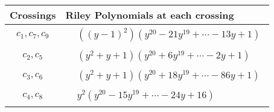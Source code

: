 \documentclass[1p]{elsarticle_modified}
\theoremstyle{definition}
\begin{document}
\begin{tabular}{m{50pt}|m{274pt}}
Crossings & \hspace{64pt}Riley Polynomials at each crossing \\
\hline $$\begin{aligned}c_{1},c_{7},c_{9}\end{aligned}$$&$\begin{aligned}
&((y-1)^2)(y^{20}-21 y^{19}+\cdots-13 y+1)
\end{aligned}$\\
\hline $$\begin{aligned}c_{2},c_{5}\end{aligned}$$&$\begin{aligned}
&(y^2+y+1)(y^{20}+6 y^{19}+\cdots-2 y+1)
\end{aligned}$\\
\hline $$\begin{aligned}c_{3},c_{6}\end{aligned}$$&$\begin{aligned}
&(y^2+y+1)(y^{20}+18 y^{19}+\cdots-86 y+1)
\end{aligned}$\\
\hline $$\begin{aligned}c_{4},c_{8}\end{aligned}$$&$\begin{aligned}
&y^2(y^{20}-15 y^{19}+\cdots-24 y+16)
\end{aligned}$\\
\hline
\end{tabular}
\vskip 2pc
\end{document}
